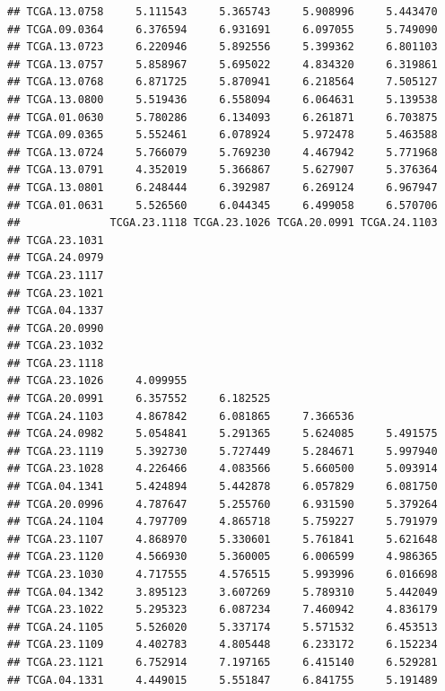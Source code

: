 \documentclass[UTF8]{beamer}\usepackage[]{graphicx}\usepackage[]{color}
\makeatletter
\newenvironment{kframe}{%
 \def\at@end@of@kframe{}%
 \ifinner\ifhmode%
  \def\at@end@of@kframe{\end{minipage}}%
  \begin{minipage}{\columnwidth}%
 \fi\fi%
 \def\FrameCommand##1{\hskip\@totalleftmargin \hskip-\fboxsep
 \colorbox{shadecolor}{##1}\hskip-\fboxsep
     \hskip-\linewidth \hskip-\@totalleftmargin \hskip\columnwidth}%
 \MakeFramed {\advance\hsize-\width
   \@totalleftmargin\z@ \linewidth\hsize
   \@setminipage}}%
 {\par\unskip\endMakeFramed%
 \at@end@of@kframe}
\newenvironment{knitrout}{}{} %
\makeatother
\begin{document}
\begin{frame}[fragile]
\begin{knitrout}
\begin{kframe}
\begin{verbatim}
## TCGA.13.0758     5.111543     5.365743     5.908996     5.443470
## TCGA.09.0364     6.376594     6.931691     6.097055     5.749090
## TCGA.13.0723     6.220946     5.892556     5.399362     6.801103
## TCGA.13.0757     5.858967     5.695022     4.834320     6.319861
## TCGA.13.0768     6.871725     5.870941     6.218564     7.505127
## TCGA.13.0800     5.519436     6.558094     6.064631     5.139538
## TCGA.01.0630     5.780286     6.134093     6.261871     6.703875
## TCGA.09.0365     5.552461     6.078924     5.972478     5.463588
## TCGA.13.0724     5.766079     5.769230     4.467942     5.771968
## TCGA.13.0791     4.352019     5.366867     5.627907     5.376364
## TCGA.13.0801     6.248444     6.392987     6.269124     6.967947
## TCGA.01.0631     5.526560     6.044345     6.499058     6.570706
##              TCGA.23.1118 TCGA.23.1026 TCGA.20.0991 TCGA.24.1103
## TCGA.23.1031                                                    
## TCGA.24.0979                                                    
## TCGA.23.1117                                                    
## TCGA.23.1021                                                    
## TCGA.04.1337                                                    
## TCGA.20.0990                                                    
## TCGA.23.1032                                                    
## TCGA.23.1118                                                    
## TCGA.23.1026     4.099955                                       
## TCGA.20.0991     6.357552     6.182525                          
## TCGA.24.1103     4.867842     6.081865     7.366536             
## TCGA.24.0982     5.054841     5.291365     5.624085     5.491575
## TCGA.23.1119     5.392730     5.727449     5.284671     5.997940
## TCGA.23.1028     4.226466     4.083566     5.660500     5.093914
## TCGA.04.1341     5.424894     5.442878     6.057829     6.081750
## TCGA.20.0996     4.787647     5.255760     6.931590     5.379264
## TCGA.24.1104     4.797709     4.865718     5.759227     5.791979
## TCGA.23.1107     4.868970     5.330601     5.761841     5.621648
## TCGA.23.1120     4.566930     5.360005     6.006599     4.986365
## TCGA.23.1030     4.717555     4.576515     5.993996     6.016698
## TCGA.04.1342     3.895123     3.607269     5.789310     5.442049
## TCGA.23.1022     5.295323     6.087234     7.460942     4.836179
## TCGA.24.1105     5.526020     5.337174     5.571532     6.453513
## TCGA.23.1109     4.402783     4.805448     6.233172     6.152234
## TCGA.23.1121     6.752914     7.197165     6.415140     6.529281
## TCGA.04.1331     4.449015     5.551847     6.841755     5.191489

\end{verbatim}
\end{kframe}
\end{knitrout}
\end{frame}
\end{document}
